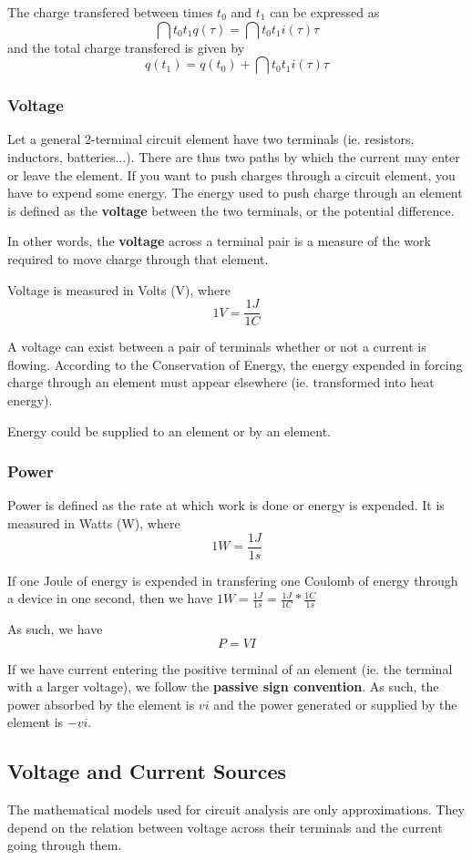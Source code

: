 \documentclass[12pt]{article}
\begin{document}
The charge transfered between times $t_0$ and $t_1$ can be expressed as \[ \dint{t_0}{t_1}{}{q(\tau)} = \dint{t_0}{t_1}{i(\tau)}{\tau} \] and the total charge transfered is given by \[ q(t_1) = q(t_0) + \dint{t_0}{t_1}{i(\tau)}{\tau} \]

\subsubsection*{Voltage}
Let a general 2-terminal circuit element have two terminals (ie. resistors, inductors, batteries...). There are thus two paths by which the current may enter or leave the element. If you want to push charges through a circuit element, you have to expend some energy. The energy used to push charge through an element is defined as the {\bf voltage} between the two terminals, or the potential difference.

In other words, the {\bf voltage} across a terminal pair is a measure of the work required to move charge through that element.

Voltage is measured in Volts (V), where \[ 1V = \frac{1J}{1C} \]

A voltage can exist between a pair of terminals whether or not a current is flowing. According to the Conservation of Energy, the energy expended in forcing charge through an element must appear elsewhere (ie. transformed into heat energy).

Energy could be supplied to an element or by an element.

\subsubsection*{Power}
Power is defined as the rate at which work is done or energy is expended. It is measured in Watts (W), where \[ 1W = \frac{1J}{1s} \]

If one Joule of energy is expended in transfering one Coulomb of energy through a device in one second, then we have $1W = \frac{1J}{1s} = \frac{1J}{1C}*\frac{1C}{1s}$

As such, we have \[ P = VI \]

If we have current entering the positive terminal of an element (ie. the terminal with a larger voltage), we follow the {\bf passive sign convention}. As such, the power absorbed by the element is $vi$ and the power generated or supplied by the element is $-vi$.

\subsection*{Voltage and Current Sources}
The mathematical models used for circuit analysis are only approximations. They depend on the relation between voltage across their terminals and the current going through them.
\end{document}
